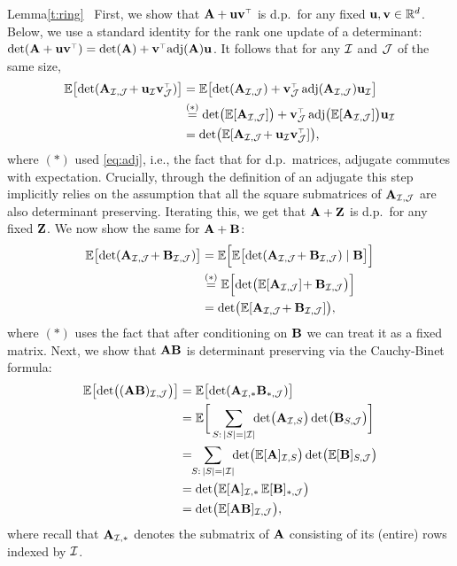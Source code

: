 \begin{proofof}{Lemma}{\ref{t:ring}} \
 First, we show that $\A+\u\v^\top$ is d.p.~for any fixed
 $\mathbf u,\mathbf v\in\mathbb R^d$. Below, we use a standard identity for the rank one
 update of a determinant:
 $\det(\A+\u\v^\top)=\det(\A)+\v^\top\!\adj(\A)\u$. It follows that
 for any $\mathcal I$ and $\mathcal{J}$ of the same size,
  \begin{align*}
\E\big[\!\det(\A_{\Ic,\Jc}\!+\u_{\Ic}\v_{\Jc}^\top)\big] &=
    \E\big[\!\det(\A_{\Ic,\Jc}) +
    \v_{\Jc}^\top\adj(\A_{\Ic,\Jc}) \u_{\Ic}\big]\\
    &\overset{(*)}{=}\det\!\big(\E[\A_{\Ic,\Jc}]\big) +
      \v_{\Jc}^\top\adj\!\big(\E[\A_{\Ic,\Jc}]\big) \u_{\Ic}\\
    &=\det\!\big(\E[\A_{\Ic,\Jc} \!+ \u_{\Ic}\v_{\Jc}^\top]\big),
  \end{align*}
  where $(*)$ used \eqref{eq:adj}, i.e., the fact that for d.p.~matrices, adjugate commutes
  with expectation. Crucially, through the definition of an adjugate
  this step implicitly relies on the assumption that all the square
  submatrices of $\mathbf A_{\mathcal I,\mathcal{J}}$ are also  determinant preserving.
  Iterating this, we get that $\mathbf A+\mathbf Z$ is d.p.~for any fixed
  $\mathbf Z$. We now show the same for $\mathbf A+\mathbf B$:
  \begin{align*}
\E\big[\!\det(\A_{\Ic,\Jc}\!+\B_{\Ic,\Jc})\big]
    &=
      \E\Big[\E\big[\!\det(\A_{\Ic,\Jc}\!+\B_{\Ic,\Jc})\mid\B\big]\Big]\\
    &\overset{(*)}{=}\E\Big[\!\det\!\big(\E[\A_{\Ic,\Jc}]\!+\B_{\Ic,\Jc}\big)\Big]\\
      &= \det\!\big(\E[\A_{\Ic,\Jc}\!+\B_{\Ic,\Jc}]\big),
  \end{align*}
  where $(*)$  uses the fact that after conditioning on $\mathbf B$ we can
  treat it as a fixed matrix. Next, we show that $\mathbf A\mathbf B$ is determinant preserving via the Cauchy-Binet formula:
  \begin{align*}
    \E\big[\!\det\!\big((\A\B)_{\Ic,\Jc}\big)\big]
    &= \E\big[\!\det(\A_{\Ic,*}\B_{*,\Jc})\big]\\
    &=\E\bigg[\sum_{S:\,|S|=|\Ic|}\!\!\det\!\big(\A_{\Ic,S}\big)
      \det\!\big(\B_{S,\Jc}\big)\bigg]\\
&=\!\!\sum_{S:\,|S|=|\Ic|}\!\!\det\!\big(\E[\A]_{\Ic,S}\big)
                                                \det\!\big(\E[\B]_{S,\Jc}\big)\\
    &=\det\!\big(\E[\A]_{\Ic,*}\, \E[\B]_{*,\Jc}\big)\\
      &= \det\!\big(\E[\A\B]_{\Ic,\Jc}\big),
  \end{align*}
  where recall that $\mathbf A_{\mathcal I,*}$ denotes the submatrix of $\mathbf A$
  consisting of its (entire) rows indexed by $\mathcal I$.
  \end{proofof}

